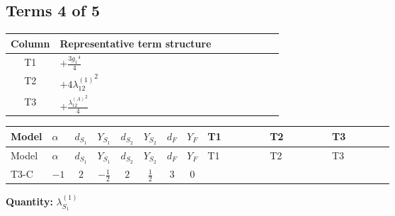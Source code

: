 \documentclass[8pt]{article}
\begin{document}
\begin{landscape}
\subsection*{Terms 4 of 5}
\begin{center}
\begin{tabular}{@{}c >{\raggedright\arraybackslash}p{0.82\linewidth}@{}}
\toprule
Column & Representative term structure \\
\midrule
T1 & \(\displaystyle +\frac{3 {g_1}^4}{4}\) \\
\midrule
T2 & \(\displaystyle +4 {\lambda_{12}^{(1)}}^2\) \\
\midrule
T3 & \(\displaystyle +\frac{{\lambda_{12}^{(A)}}^2}{4}\) \\
\midrule
\bottomrule
\end{tabular}
\end{center}
\smallskip
\tiny
\begin{longtable}{@{}llcccccc >{\raggedright\arraybackslash}p{0.21\linewidth} >{\raggedright\arraybackslash}p{0.21\linewidth} >{\raggedright\arraybackslash}p{0.21\linewidth}@{}}
\toprule
Model & $\alpha$ & $d_{S_1}$ & $Y_{S_1}$ & $d_{S_2}$ & $Y_{S_2}$ & $d_F$ & $Y_F$ & T1 & T2 & T3 \\
\midrule
\endfirsthead
\toprule
Model & $\alpha$ & $d_{S_1}$ & $Y_{S_1}$ & $d_{S_2}$ & $Y_{S_2}$ & $d_F$ & $Y_F$ & T1 & T2 & T3 \\
\midrule
\endhead
T3-C & $-1$ & $2$ & $-\frac{1}{2}$ & $2$ & $\frac{1}{2}$ & $3$ & $0$ & \scriptsize\adjustbox{max width=\linewidth}{$\begin{gathered} +\frac{3 {g_1}^4}{4}\end{gathered}$} & \scriptsize\adjustbox{max width=\linewidth}{$\begin{gathered} +4 {\lambda_{12}^{(1)}}^2\end{gathered}$} & \scriptsize\adjustbox{max width=\linewidth}{$\begin{gathered} +\frac{{\lambda_{12}^{(A)}}^2}{4}\end{gathered}$} \\
\midrule
\bottomrule
\end{longtable}
\clearpage
\noindent\textbf{Quantity: }$\lambda_{S_1}^{(1)}$\par\smallskip

\end{landscape}
\end{document}

